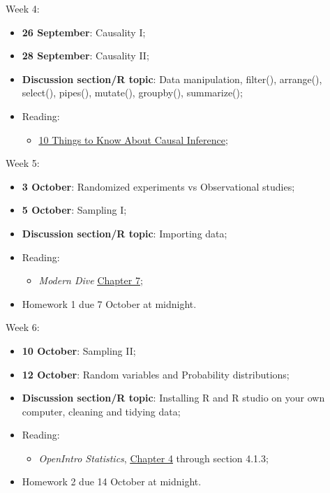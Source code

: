 \documentclass[12pt]{article}
\begin{document}
\noindent Week 4:
\begin{itemize}
\item \textbf{26 September}: Causality I;
\item \textbf{28 September}: Causality II;
\item \textbf{Discussion section/R topic}: Data manipulation, filter(), arrange(), select(), pipes(), mutate(), groupby(), summarize();
\item Reading:
\begin{itemize}
\item \href{https://egap.org/resource/10-things-to-know-about-causal-inference/}{\color{blue}\underline{10 Things to Know About Causal Inference}};
\end{itemize}
\end{itemize}

\noindent Week 5:
\begin{itemize}
\item \textbf{3 October}: Randomized experiments vs Observational studies;
\item \textbf{5 October}: Sampling I;
\item \textbf{Discussion section/R topic}: Importing data;
\item Reading:
\begin{itemize}
\item \textit{Modern Dive} \href{https://moderndive.com/7-sampling.html}{\color{blue}\underline{Chapter 7}};
\end{itemize}
\item Homework 1 due 7 October at midnight.
\end{itemize}

\noindent Week 6:
\begin{itemize}
\item \textbf{10 October}: Sampling II;
\item \textbf{12 October}: Random variables and Probability distributions;
\item \textbf{Discussion section/R topic}: Installing R and R studio on your own computer, cleaning and tidying data;
\item Reading:
\begin{itemize}
\item \textit{OpenIntro Statistics}, \href{https://leanpub.com/os}{\color{blue}\underline{Chapter 4}}  through section 4.1.3;
\end{itemize}
\item Homework 2 due 14 October at midnight.
\end{itemize}
\end{document}
